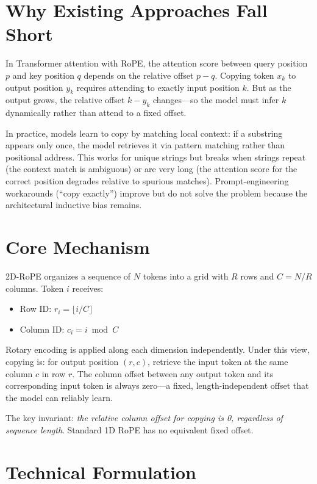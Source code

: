 \documentclass[10pt,twocolumn]{article}
\begin{document}
\section{Why Existing Approaches Fall Short}

In Transformer attention with RoPE, the attention score between query
position $p$ and key position $q$ depends on the relative offset $p - q$.
Copying token $x_k$ to output position $y_k$ requires attending to
exactly input position $k$. But as the output grows, the relative offset
$k - y_k$ changes---so the model must infer $k$ dynamically rather
than attend to a fixed offset.

In practice, models learn to copy by matching local context: if a
substring appears only once, the model retrieves it via pattern matching
rather than positional address. This works for unique strings but breaks
when strings repeat (the context match is ambiguous) or are very long
(the attention score for the correct position degrades relative to
spurious matches). Prompt-engineering workarounds (``copy exactly'')
improve but do not solve the problem because the architectural inductive
bias remains.

\section{Core Mechanism}

2D-RoPE organizes a sequence of $N$ tokens into a grid with $R$ rows and
$C = N/R$ columns. Token $i$ receives:
\begin{itemize}[itemsep=1pt,parsep=0pt]
  \item Row ID: $r_i = \lfloor i/C \rfloor$
  \item Column ID: $c_i = i \bmod C$
\end{itemize}

Rotary encoding is applied along each dimension independently. Under this
view, copying is: for output position $(r, c)$, retrieve the input token
at the same column $c$ in row $r$. The column offset between any output
token and its corresponding input token is always zero---a fixed,
length-independent offset that the model can reliably learn.

The key invariant: \textit{the relative column offset for copying is 0,
regardless of sequence length}. Standard 1D RoPE has no equivalent fixed
offset.

\section{Technical Formulation}
\end{document}
